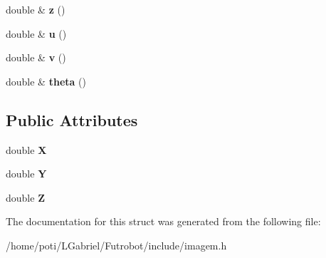 \begin{DoxyCompactItemize}
\item 
double \& {\bfseries z} ()\hypertarget{structCoord3_a0a454e3f08a960c7517d6dbb6f775ebf}{}\label{structCoord3_a0a454e3f08a960c7517d6dbb6f775ebf}

\item 
double \& {\bfseries u} ()\hypertarget{structCoord3_a5bb5578b719b8aa2b210df69b7a626c7}{}\label{structCoord3_a5bb5578b719b8aa2b210df69b7a626c7}

\item 
double \& {\bfseries v} ()\hypertarget{structCoord3_a25754e95899c4f8aa5720be4def0f77e}{}\label{structCoord3_a25754e95899c4f8aa5720be4def0f77e}

\item 
double \& {\bfseries theta} ()\hypertarget{structCoord3_adb46a5b1aba0bbc6e926c50aeeebe02a}{}\label{structCoord3_adb46a5b1aba0bbc6e926c50aeeebe02a}

\end{DoxyCompactItemize}
\subsection*{Public Attributes}
\begin{DoxyCompactItemize}
\item 
double {\bfseries X}\hypertarget{structCoord3_a58b49d019d9c7978b73406d6b112485d}{}\label{structCoord3_a58b49d019d9c7978b73406d6b112485d}

\item 
double {\bfseries Y}\hypertarget{structCoord3_ac7ada5475fb4fe38463e2164b18e4f95}{}\label{structCoord3_ac7ada5475fb4fe38463e2164b18e4f95}

\item 
double {\bfseries Z}\hypertarget{structCoord3_a68ab7360c4b078714d906462c506125b}{}\label{structCoord3_a68ab7360c4b078714d906462c506125b}

\end{DoxyCompactItemize}


The documentation for this struct was generated from the following file\+:\begin{DoxyCompactItemize}
\item 
/home/poti/\+L\+Gabriel/\+Futrobot/include/imagem.\+h\end{DoxyCompactItemize}
